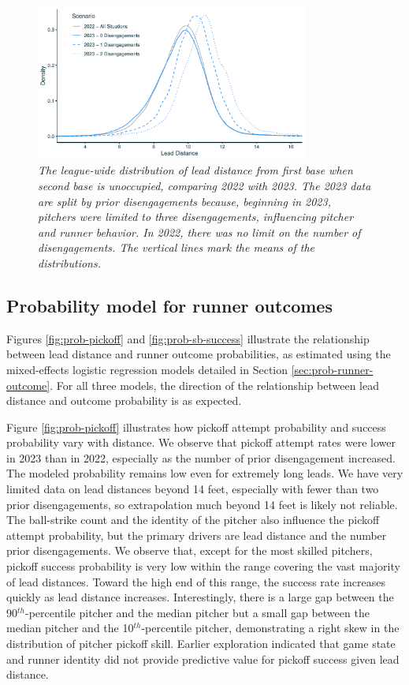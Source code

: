 \documentclass{article}
\begin{document}
      \begin{figure}[H]
        \centering
        \includegraphics[width = 0.8\textwidth]{leads_overall_light.pdf}
        \caption{
          \it The league-wide distribution of lead distance from first base when second base is unoccupied, comparing 2022 with 2023. The 2023 data are split by prior disengagements because, beginning in 2023, pitchers were limited to three disengagements, influencing pitcher and runner behavior. In 2022, there was no limit on the number of disengagements. The vertical lines mark the means of the distributions.
        }
        \label{fig:leads-overall}
      \end{figure}
      
    \subsection{Probability model for runner outcomes}

      Figures \ref{fig:prob-pickoff} and \ref{fig:prob-sb-success} illustrate the relationship between lead distance and runner outcome probabilities, as estimated using the mixed-effects logistic regression models detailed in Section \ref{sec:prob-runner-outcome}. For all three models, the direction of the relationship between lead distance and outcome probability is as expected.
      
      Figure \ref{fig:prob-pickoff} illustrates how pickoff attempt probability and success probability vary with distance. We observe that pickoff attempt rates were lower in 2023 than in 2022, especially as the number of prior disengagement increased. The modeled probability remains low even for extremely long leads. We have very limited data on lead distances beyond 14 feet, especially with fewer than two prior disengagements, so extrapolation much beyond 14 feet is likely not reliable. The ball-strike count and the identity of the pitcher also influence the pickoff attempt probability, but the primary drivers are lead distance and the number prior disengagements. We observe that, except for the most skilled pitchers, pickoff success probability is very low within the range covering the vast majority of lead distances. Toward the high end of this range, the success rate increases quickly as lead distance increases. Interestingly, there is a large gap between the 90$^{th}$-percentile pitcher and the median pitcher but a small gap between the median pitcher and the 10$^{th}$-percentile pitcher, demonstrating a right skew in the distribution of pitcher pickoff skill. Earlier exploration indicated that game state and runner identity did not provide predictive value for pickoff success given lead distance.
 
\end{document}
